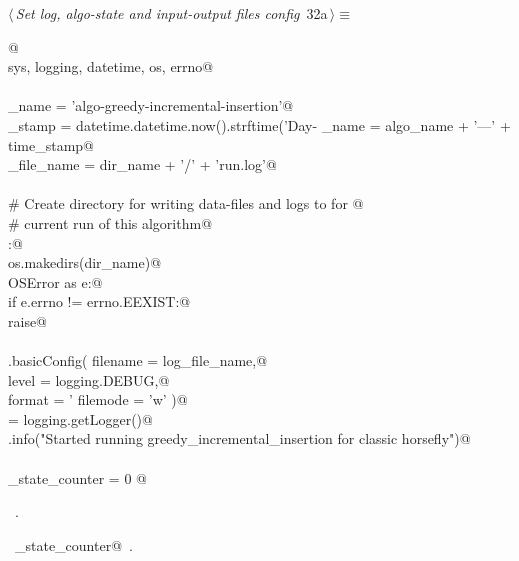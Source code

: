 \documentclass[11.5pt]{report}
\begin{document}
\begin{flushleft} \small\label{scrap23}\raggedright\small
{} $\langle\,${\itshape Set log, algo-state and input-output files config}\nobreak\ {\footnotesize {32a}}$\,\rangle\equiv$
\vspace{-1ex}
\begin{list}{}{} \item
\mbox{}\verb@  @\\
\mbox{}\verb@import sys, logging, datetime, os, errno@\\
\mbox{}\verb@@\\
\mbox{}\verb@algo_name     = 'algo-greedy-incremental-insertion'@\\
\mbox{}\verb@time_stamp    = datetime.datetime.now().strftime('Day-%Y-%m-%d_ClockTime-%H:%M:%S')@\\
\mbox{}\verb@dir_name      = algo_name + '---' + time_stamp@\\
\mbox{}\verb@log_file_name = dir_name + '/' + 'run.log'@\\
\mbox{}\verb@@\\
\mbox{}\verb@# Create directory for writing data-files and logs to for @\\
\mbox{}\verb@# current run of this algorithm@\\
\mbox{}\verb@try:@\\
\mbox{}\verb@    os.makedirs(dir_name)@\\
\mbox{}\verb@except OSError as e:@\\
\mbox{}\verb@    if e.errno != errno.EEXIST:@\\
\mbox{}\verb@        raise@\\
\mbox{}\verb@@\\
\mbox{}\verb@logging.basicConfig( filename = log_file_name,@\\
\mbox{}\verb@                     level    = logging.DEBUG,@\\
\mbox{}\verb@                     format   = '%(asctime)s: %(levelname)s: %(message)s',@\\
\mbox{}\verb@                     filemode = 'w' )@\\
\mbox{}\verb@logger = logging.getLogger()@\\
\mbox{}\verb@logger.info("Started running greedy_incremental_insertion for classic horsefly")@\\
\mbox{}\verb@@\\
\mbox{}\verb@algo_state_counter = 0 @\\
\mbox{}\verb@@{\NWsep}
\end{list}
\vspace{-1.5ex}
\footnotesize
\begin{list}{}{\setlength{\itemsep}{-\parsep}\setlength{\itemindent}{-\leftmargin}}
\item \NWtxtMacroRefIn\ .
\item \NWtxtIdentsDefed\nobreak\  \verb@algo_state_counter@\nobreak\ .
\item{}
\end{list}
\vspace{4ex}
\end{flushleft}
\end{document}
